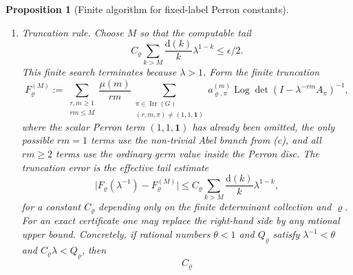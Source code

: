 \documentclass[11pt,a4paper]{amsart}
\theoremstyle{plain}
\newtheorem{proposition}[theorem]{Proposition}
\theoremstyle{definition}
\theoremstyle{remark}
\DeclareMathOperator{\Irr}{Irr}
\DeclareMathOperator{\Log}{Log}
\newcommand{\abs}[1]{\lvert #1 \rvert}
\begin{document}
\begin{proposition}[Finite algorithm for fixed-label Perron constants]
\begin{enumerate}[label=\textup{(\alph*)},leftmargin=*]
      finite part or a branch value to
      \(\log\det(I-\lambda^{-1}A_{\mathbf1})^{-1}\).
      Normalize every remaining logarithm from the germ
      \(\Log\det(I-zA_\pi)^{-1}=0\) at \(z=0\).  For \(rm=1\) this means
      Abel continuation along \(z=t\lambda^{-1}\), \(0\le t\uparrow1\), and
      necessarily \(\pi\neq\mathbf1\).  For \(rm\ge2\) it means the ordinary
      value of the same germ at \(z=\lambda^{-rm}\), where the determinant
      is strictly inside its Perron radius.
    \item \emph{Truncation rule.}  Choose \(M\) so that the computable tail
      \begin{equation}\label{eq:fixed-label-perron-finite-algorithm-tail-choice}
        C_\varrho
        \sum_{k>M}\frac{\mathrm d(k)}{k}\lambda^{1-k}
        \le \epsilon/2 .
      \end{equation}
      This finite search terminates because \(\lambda>1\).  Form the finite
      truncation
      \begin{equation}\label{eq:fixed-label-perron-finite-algorithm-truncation}
        F_\varrho^{(M)}
        :=
        \sum_{\substack{r,m\ge1\\rm\le M}}
        \frac{\mu(m)}{rm}
        \sum_{\substack{\pi\in\Irr(G)\\(r,m,\pi)\neq(1,1,\mathbf1)}}
          a_{\varrho,\pi}^{(m)}
          \Log\det(I-\lambda^{-rm}A_\pi)^{-1},
      \end{equation}
      where the scalar Perron term \((1,1,\mathbf1)\) has already been
      omitted, the only possible \(rm=1\) terms use the non-trivial Abel
      branch from \textup{(c)}, and all \(rm\ge2\) terms use the ordinary germ value
      inside the Perron disc.  The truncation error is the effective tail
      estimate
      \begin{equation}\label{eq:fixed-label-perron-finite-algorithm-error}
        \abs{F_\varrho(\lambda^{-1})-F_\varrho^{(M)}}
        \le
        C_\varrho
        \sum_{k>M}\frac{\mathrm d(k)}{k}\lambda^{1-k},
      \end{equation}
      for a constant \(C_\varrho\) depending only on the finite determinant
      collection and \(\varrho\).  For an exact certificate one may replace the
      right-hand side by any rational upper bound.  Concretely, if rational
      numbers \(\theta<1\) and \(Q_\varrho\) satisfy
      \(\lambda^{-1}<\theta\) and \(C_\varrho\lambda<Q_\varrho\), then
      \begin{equation}\label{eq:fixed-label-rational-tail-envelope}
        C_\varrho

\end{equation}
\end{enumerate}
\end{proposition}
\end{document}
